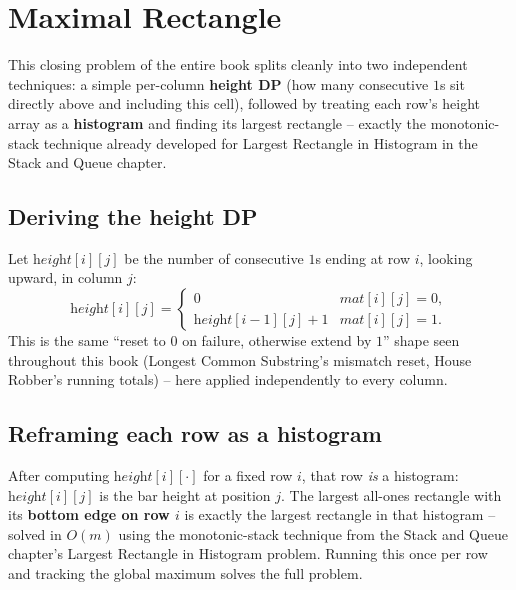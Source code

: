 \section{Maximal Rectangle}
\label{sec:dp-maximal-rectangle}


\begin{patternbox}
This closing problem of the entire book splits cleanly into two
independent techniques: a simple per-column \textbf{height DP} (how
many consecutive $1$s sit directly above and including this cell),
followed by treating each row's height array as a \textbf{histogram}
and finding its largest rectangle -- exactly the monotonic-stack
technique already developed for Largest Rectangle in Histogram in the
Stack and Queue chapter.
\end{patternbox}

\subsection*{Deriving the height DP}

Let $\textit{height}[i][j]$ be the number of consecutive $1$s ending at
row $i$, looking upward, in column $j$:
\[
  \textit{height}[i][j] = \begin{cases}
  0 & \textit{mat}[i][j]=0, \\
  \textit{height}[i{-}1][j] + 1 & \textit{mat}[i][j]=1.
  \end{cases}
\]
This is the same ``reset to $0$ on failure, otherwise extend by $1$''
shape seen throughout this book (Longest Common Substring's mismatch
reset, House Robber's running totals) -- here applied independently to
every column.

\subsection*{Reframing each row as a histogram}

After computing $\textit{height}[i][\cdot]$ for a fixed row $i$, that
row \emph{is} a histogram: $\textit{height}[i][j]$ is the bar height at
position $j$. The largest all-ones rectangle with its \textbf{bottom
edge on row $i$} is exactly the largest rectangle in that histogram --
solved in $O(m)$ using the monotonic-stack technique from the Stack and
Queue chapter's Largest Rectangle in Histogram problem. Running this
once per row and tracking the global maximum solves the full problem.


